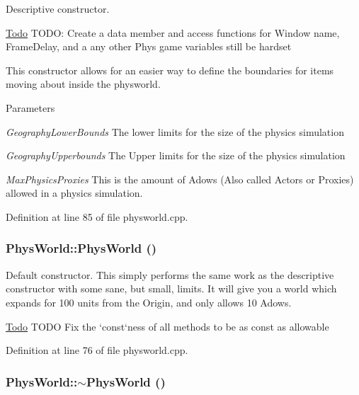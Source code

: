Descriptive constructor. \begin{Desc}
\item[\hyperlink{todo__todo000011}{Todo}]TODO: Create a data member and access functions for Window name, FrameDelay, and a any other Phys game variables still be hardset \end{Desc}


This constructor allows for an easier way to define the boundaries for items moving about inside the physworld. 
\begin{DoxyParams}{Parameters}
\item[{\em GeographyLowerBounds}]The lower limits for the size of the physics simulation \item[{\em GeographyUpperbounds}]The Upper limits for the size of the physics simulation \item[{\em MaxPhysicsProxies}]This is the amount of Adows (Also called Actors or Proxies) allowed in a physics simulation. \end{DoxyParams}


Definition at line 85 of file physworld.cpp.\hypertarget{classPhysWorld_a6ded8026b0cd72e7877830698197adf0}{
\subsubsection[{PhysWorld}]{\setlength{\rightskip}{0pt plus 5cm}PhysWorld::PhysWorld ()}}
\label{db/df5/classPhysWorld_a6ded8026b0cd72e7877830698197adf0}


Default constructor. This simply performs the same work as the descriptive constructor with some sane, but small, limits. It will give you a world which expands for 100 units from the Origin, and only allows 10 Adows.

\begin{Desc}
\item[\hyperlink{todo__todo000005}{Todo}]TODO Fix the `const`ness of all methods to be as const as allowable \end{Desc}


Definition at line 76 of file physworld.cpp.\hypertarget{classPhysWorld_acdfe3b4c1c236860dc7dff945cfe5b07}{
\subsubsection[{$\sim$PhysWorld}]{\setlength{\rightskip}{0pt plus 5cm}PhysWorld::$\sim$PhysWorld ()}}
\label{db/df5/classPhysWorld_acdfe3b4c1c236860dc7dff945cfe5b07}



